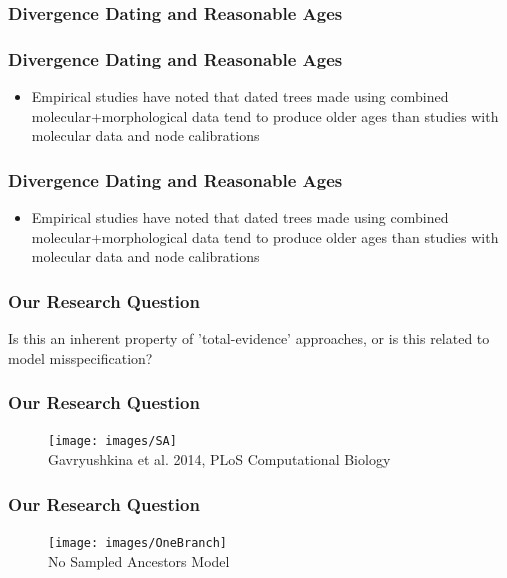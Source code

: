 \documentclass[]{beamer}
\begin{document}
\begin{frame}
\frametitle{Divergence Dating and Reasonable Ages}
\end{frame}

\begin{frame}
\frametitle{Divergence Dating and Reasonable Ages}
\begin{itemize}
\item Empirical studies have noted that dated trees made using combined molecular+morphological data tend to produce older ages than studies with molecular data and node calibrations
\end{itemize}
\end{frame}

\begin{frame}
\frametitle{Divergence Dating and Reasonable Ages}
\begin{itemize}
\item Empirical studies have noted that dated trees made using combined molecular+morphological data tend to produce older ages than studies with molecular data and node calibrations
\end{itemize}
\end{frame}

\begin{frame}
\frametitle{Our Research Question}
Is this an inherent property of 'total-evidence' approaches, or is this related to model misspecification?
\end{frame}



\begin{frame}
\frametitle{Our Research Question}
\begin{figure}
\texttt{[image: images/SA]} \\
Gavryushkina et al. 2014, PLoS Computational Biology
\end{figure}
\end{frame}

\begin{frame}
\frametitle{Our Research Question}
\begin{figure}
\texttt{[image: images/OneBranch]} \\
No Sampled Ancestors Model
\end{figure}
\end{frame}
\end{document}
